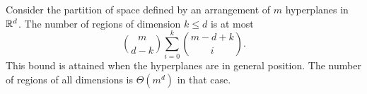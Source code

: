 \begin{theorem}[name={Buck~\cite{Bu43}, see also~\cite[Theorem~24.1.1 and Corollary~24.1.2]{Hal04}},label=thm:buck]
Consider the partition of space defined by an arrangement of $m$ hyperplanes in
$\mathbb{R}^d$.
The number of regions of dimension $k \le d$ is at most
\begin{displaymath}
	{m \choose d-k} \sum_{i=0}^{k} {m-d+k \choose i}.
\end{displaymath}
This bound is attained when the hyperplanes are in general position.
The number of regions of all dimensions is \(\Theta(m^d)\) in that case.
\end{theorem}
